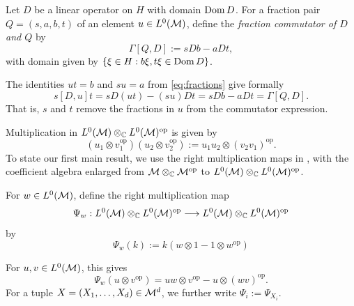 \begin{definition}\label{def:fraction-commutator}
Let $D$ be a linear operator on $H$ with domain $\operatorname{Dom} D$.
For a fraction pair $Q=(s,a,b,t)$ of an element $u\in L^0(\mathcal M)$, define the \emph{fraction commutator of $D$ and $Q$} by
\begin{equation}
 \Gamma[Q,D]:=sDb-aDt,
 \label{eq:fraction-commutator}
\end{equation}
with domain given by $\{\xi\in H: b\xi,t\xi\in\operatorname{Dom} D\}$.
\end{definition}
The identities $ut=b$ and $su=a$ from \eqref{eq:fractions} give formally
\[
 s[D,u]t=sD(ut)-(su)D t=sD b-aD t=\Gamma[Q,D].
\]
That is, $s$ and $t$ remove the fractions in $u$ from the commutator expression.

Multiplication in $L^0(\mathcal M)\otimes_{\mathbb C}L^0(\mathcal M)^{\mathrm{op}}$ is given by
\[
 (u_1\otimes v_1^{\mathrm{op}})(u_2\otimes v_2^{\mathrm{op}})
 :=u_1u_2\otimes(v_2v_1)^{\mathrm{op}}.
\]
To state our first main result, we use the right multiplication maps in \cite[Section~3.1.1, equation~(3.1)]{CS05},
with the coefficient algebra enlarged from $\mathcal M\otimes_{\mathbb C}\mathcal M^{\mathrm{op}}$ to $L^0(\mathcal M)\otimes_{\mathbb C}L^0(\mathcal M)^{\mathrm{op}}$.

\begin{definition}\label{def:psi}
For $w\in L^0(\mathcal M)$, define the right multiplication map
\[
 \Psi_w:L^0(\mathcal M)\otimes_{\mathbb C}L^0(\mathcal M)^{\mathrm{op}}
 \longrightarrow L^0(\mathcal M)\otimes_{\mathbb C}L^0(\mathcal M)^{\mathrm{op}}
\]
by
\begin{equation}
 \Psi_w(k):=k(w\otimes1-1\otimes w^{\mathrm{op}})
 \label{eq:psi}
\end{equation}
\end{definition}

For $u,v\in L^0(\mathcal M)$, this gives
\[
 \Psi_w(u\otimes v^{\mathrm{op}})
 =uw\otimes v^{\mathrm{op}}-u\otimes(wv)^{\mathrm{op}}.
\]
For a tuple $X=(X_1,\ldots,X_d)\in\mathcal M^d$, we further write $\Psi_i:=\Psi_{X_i}$.

